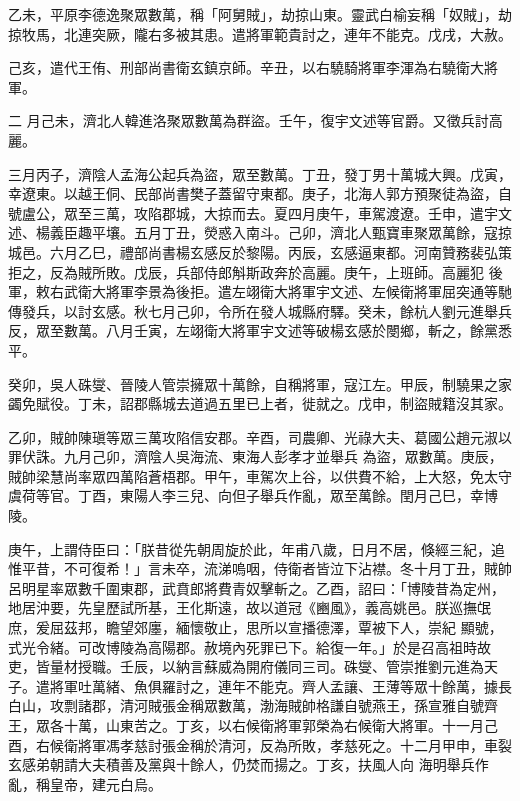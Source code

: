 \begin{pinyinscope}
 乙未，平原李德逸聚眾數萬，稱「阿舅賊」，劫掠山東。靈武白榆妄稱「奴賊」，劫掠牧馬，北連突厥，隴右多被其患。遣將軍範貴討之，連年不能克。戊戌，大赦。



 己亥，遣代王侑、刑部尚書衛玄鎮京師。辛丑，以右驍騎將軍李渾為右驍衛大將軍。



 二
 月己未，濟北人韓進洛聚眾數萬為群盜。壬午，復宇文述等官爵。又徵兵討高麗。



 三月丙子，濟陰人孟海公起兵為盜，眾至數萬。丁丑，發丁男十萬城大興。戊寅，幸遼東。以越王侗、民部尚書樊子蓋留守東都。庚子，北海人郭方預聚徒為盜，自號盧公，眾至三萬，攻陷郡城，大掠而去。夏四月庚午，車駕渡遼。壬申，遣宇文述、楊義臣趣平壤。五月丁丑，熒惑入南斗。己卯，濟北人甄寶車聚眾萬餘，寇掠城邑。六月乙巳，禮部尚書楊玄感反於黎陽。丙辰，玄感逼東都。河南贊務裴弘策拒之，反為賊所敗。戊辰，兵部侍郎斛斯政奔於高麗。庚午，上班師。高麗犯
 後軍，敕右武衛大將軍李景為後拒。遣左翊衛大將軍宇文述、左候衛將軍屈突通等馳傳發兵，以討玄感。秋七月己卯，令所在發人城縣府驛。癸未，餘杭人劉元進舉兵反，眾至數萬。八月壬寅，左翊衛大將軍宇文述等破楊玄感於閿鄉，斬之，餘黨悉平。



 癸卯，吳人硃燮、晉陵人管崇擁眾十萬餘，自稱將軍，寇江左。甲辰，制驍果之家蠲免賦役。丁未，詔郡縣城去道過五里已上者，徙就之。戊申，制盜賊籍沒其家。



 乙卯，賊帥陳瑱等眾三萬攻陷信安郡。辛酉，司農卿、光祿大夫、葛國公趙元淑以罪伏誅。九月己卯，濟陰人吳海流、東海人彭孝才並舉兵
 為盜，眾數萬。庚辰，賊帥梁慧尚率眾四萬陷蒼梧郡。甲午，車駕次上谷，以供費不給，上大怒，免太守虞荷等官。丁酉，東陽人李三兒、向但子舉兵作亂，眾至萬餘。閏月己巳，幸博陵。



 庚午，上謂侍臣曰：「朕昔從先朝周旋於此，年甫八歲，日月不居，倏經三紀，追惟平昔，不可復希！」言未卒，流涕嗚咽，侍衛者皆泣下沾襟。冬十月丁丑，賊帥呂明星率眾數千圍東郡，武賁郎將費青奴擊斬之。乙酉，詔曰：「博陵昔為定州，地居沖要，先皇歷試所基，王化斯遠，故以道冠《豳風》，義高姚邑。朕巡撫氓庶，爰屈茲邦，瞻望郊廛，緬懷敬止，思所以宣播德澤，覃被下人，崇紀
 顯號，式光令緒。可改博陵為高陽郡。赦境內死罪已下。給復一年。」於是召高祖時故吏，皆量材授職。壬辰，以納言蘇威為開府儀同三司。硃燮、管崇推劉元進為天子。遣將軍吐萬緒、魚俱羅討之，連年不能克。齊人孟讓、王薄等眾十餘萬，據長白山，攻剽諸郡，清河賊張金稱眾數萬，渤海賊帥格謙自號燕王，孫宣雅自號齊王，眾各十萬，山東苦之。丁亥，以右候衛將軍郭榮為右候衛大將軍。十一月己酉，右候衛將軍馮孝慈討張金稱於清河，反為所敗，孝慈死之。十二月甲申，車裂玄感弟朝請大夫積善及黨與十餘人，仍焚而揚之。丁亥，扶風人向
 海明舉兵作亂，稱皇帝，建元白烏。




\end{pinyinscope}
